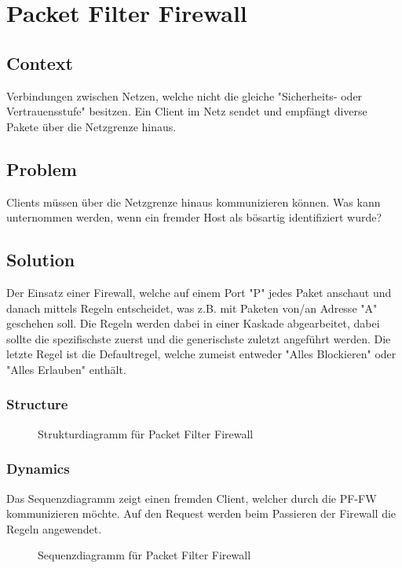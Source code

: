 \chapter{Packet Filter Firewall}

\section{Context}
Verbindungen zwischen Netzen, welche nicht die gleiche "Sicherheits- oder Vertrauensstufe" besitzen. Ein Client im Netz sendet und empfängt diverse Pakete über die Netzgrenze hinaus.

\section{Problem}
Clients müssen über die Netzgrenze hinaus kommunizieren können. Was kann unternommen werden, wenn ein fremder Host als bösartig identifiziert wurde?

\section{Solution}
Der Einsatz einer Firewall, welche auf einem Port "P" jedes Paket anschaut und danach mittels Regeln entscheidet, was z.B. mit Paketen von/an Adresse "A" geschehen soll. Die Regeln werden dabei in einer Kaskade abgearbeitet, dabei sollte die spezifischste zuerst und die generischste zuletzt angeführt werden. Die letzte Regel ist die Defaultregel, welche zumeist entweder "Alles Blockieren" oder "Alles Erlauben" enthält.

\subsection{Structure}
\begin{figure}[H]
  \centering
  
  \caption{Strukturdiagramm f\"ur Packet Filter Firewall}
\end{figure}

\subsection{Dynamics}
Das Sequenzdiagramm zeigt einen fremden Client, welcher durch die PF-FW kommunizieren möchte. Auf den Request werden beim Passieren der Firewall die Regeln angewendet.

\begin{figure}[H]
  \centering
  
  \caption{Sequenzdiagramm f\"ur Packet Filter Firewall}
\end{figure}

